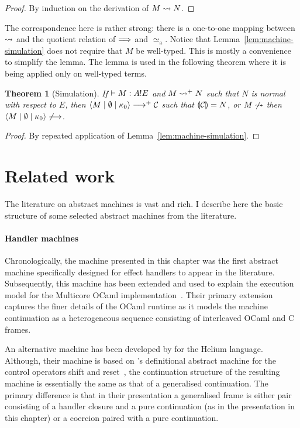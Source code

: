 \documentclass[12pt,phd,lfcs,twoside,openright,logo,leftchapter,normalheadings]{infthesis}
\theoremstyle{plain}
\newtheorem{theorem}{Theorem}[chapter]
\theoremstyle{definition}
\begin{document}
%
\begin{proof}
By induction on the derivation of $M \leadsto N$.
\end{proof}
%
The correspondence here is rather strong: there is a one-to-one
mapping between $\leadsto$ and the quotient relation of $\Longrightarrow$
and $\simeq_{\textrm{a}}$. %
%
Notice that Lemma~\ref{lem:machine-simulation} does not require that
$M$ be well-typed. This is mostly a convenience to simplify the
lemma. The lemma is used in the following theorem where it is being
applied only on well-typed terms.
%
\begin{theorem}[Simulation]\label{thm:handler-simulation}
  If $\vdash M : A ! E$ and $M \leadsto^+ N$ such that $N$ is
  normal with respect to $E$, then
  $\langle M \mid \emptyset \mid \kappa_0 \rangle \longrightarrow^+ \mathcal{C}$ such that
  $\llparenthesis \mathcal{C} \rrparenthesis = N$, or $M \not\leadsto$ then
  $\langle M \mid \emptyset \mid \kappa_0 \rangle \not\longrightarrow$.
\end{theorem}
%
\begin{proof}
By repeated application of Lemma~\ref{lem:machine-simulation}.
\end{proof}

\section{Related work}
\label{sec:related-work-abstract-machine}
The literature on abstract machines is vast and rich. I describe here
the basic structure of some selected abstract machines from the
literature.

\paragraph{Handler machines} Chronologically, the machine presented in
this chapter was the first abstract machine specifically designed for
effect handlers to appear in the literature. Subsequently, this
machine has been extended and used to explain the execution model for
the Multicore OCaml
implementation~\cite{SivaramakrishnanDWKJM21}. Their primary extension
captures the finer details of the OCaml runtime as it models the
machine continuation as a heterogeneous sequence consisting of
interleaved OCaml and C frames.

An alternative machine has been developed by \citet{BiernackiPPS19}
for the Helium language. Although, their machine is based on
\citeauthor{BiernackaBD05}'s definitional abstract machine for the
control operators shift and reset~\cite{BiernackaBD05}, the
continuation structure of the resulting machine is essentially the
same as that of a generalised continuation. The primary difference is
that in their presentation a generalised frame is either pair
consisting of a handler closure and a pure continuation (as in the
presentation in this chapter) or a coercion paired with a pure
continuation.
\end{document}
